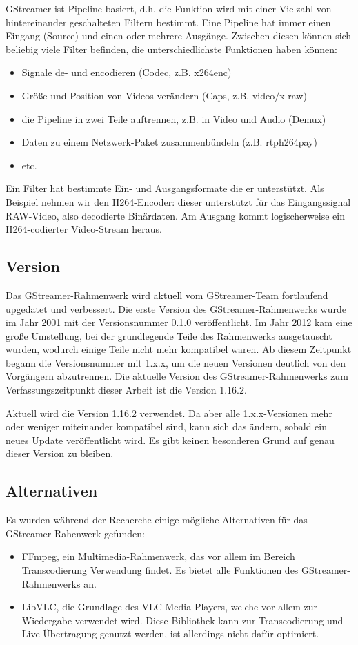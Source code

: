 GStreamer ist Pipeline-basiert, d.h. die Funktion wird mit einer Vielzahl von hintereinander geschalteten Filtern bestimmt.
Eine Pipeline hat immer einen Eingang (Source) und einen oder mehrere Ausgänge.
Zwischen diesen können sich beliebig viele Filter befinden, die unterschiedlichste Funktionen haben können:
\begin{itemize}
    \item Signale de- und encodieren (Codec, z.B. x264enc)
    \item Größe und Position von Videos verändern (Caps, z.B. video/x-raw)
    \item die Pipeline in zwei Teile auftrennen, z.B. in Video und Audio (Demux)
    \item Daten zu einem Netzwerk-Paket zusammenbündeln (z.B. rtph264pay)
    \item etc.
\end{itemize}
Ein Filter hat bestimmte Ein- und Ausgangsformate die er unterstützt.
Als Beispiel nehmen wir den H264-Encoder:
dieser unterstützt für das Eingangssignal RAW-Video, also decodierte Binärdaten. Am Ausgang kommt logischerweise ein H264-codierter Video-Stream heraus.\par

\subsection{Version}
Das GStreamer-Rahmenwerk wird aktuell vom GStreamer-Team fortlaufend upgedatet und verbessert.
Die erste Version des GStreamer-Rahmenwerks wurde im Jahr 2001 mit der Versionsnummer 0.1.0 veröffentlicht.
Im Jahr 2012 kam eine große Umstellung, bei der grundlegende Teile des Rahmenwerks ausgetauscht wurden, wodurch einige Teile nicht mehr kompatibel waren.
Ab diesem Zeitpunkt begann die Versionsnummer mit 1.x.x, um die neuen Versionen deutlich von den Vorgängern abzutrennen.
Die aktuelle Version des GStreamer-Rahmenwerks zum Verfassungszeitpunkt dieser Arbeit ist die Version 1.16.2.\par

Aktuell wird die Version 1.16.2 verwendet. Da aber alle 1.x.x-Versionen mehr oder weniger miteinander kompatibel sind, kann sich das ändern, sobald ein neues Update veröffentlicht wird. Es gibt keinen besonderen Grund auf genau dieser Version zu bleiben.\par

\subsection{Alternativen}
Es wurden während der Recherche einige mögliche Alternativen für das GStreamer-Rahenwerk gefunden:
\begin{itemize}
    \item FFmpeg, ein Multimedia-Rahmenwerk, das vor allem im Bereich Transcodierung Verwendung findet. Es bietet alle Funktionen des GStreamer-Rahmenwerks an.
    \item LibVLC, die Grundlage des VLC Media Players, welche vor allem zur Wiedergabe verwendet wird. Diese Bibliothek kann zur Transcodierung und Live-Übertragung genutzt werden, ist allerdings nicht dafür optimiert.
\end{itemize}


